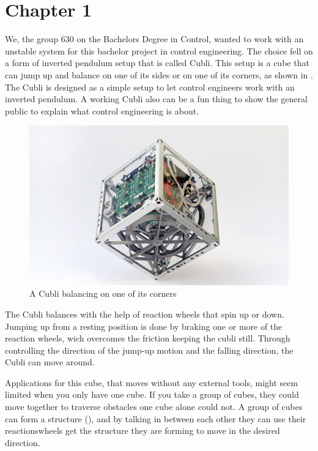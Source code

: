 \chapter{Chapter 1}
We, the group 630 on the Bachelors Degree in Control, wanted to work with an unstable system for this bachelor project in control engineering. The choice fell on a form of inverted pendulum setup that is called Cubli. This setup is a cube that can jump up and balance on one of its sides or on one of its corners, as shown in .
The Cubli is designed as a simple setup to let control engineers work with an inverted pendulum. A working Cubli also can be a fun thing to show the general public to explain what control engineering is about.  \cite{MGajamohan}

\begin{figure}[H] 
	\centering 
	\includegraphics[scale=1.3]{figures/CubliCorner-700x430}
	\caption{A Cubli balancing on one of its corners\cite{RAndrea}}
	\label{CubliCorner}
\end{figure} 
The Cubli balances with the help of reaction wheels that spin up or down. Jumping up from a resting position is done by braking one or more of the reaction wheels, wich overcomes the friction keeping the cubli still. 
Through controlling the direction of the jump-up motion and the falling direction, the Cubli can move around.

Applications for this cube, that moves without any external tools, might seem limited when you only have one cube. If you take a group of cubes, they could move together to traverse obstacles one cube alone could not. \cite{JRomanishin}
A group of cubes can form a structure (), and by talking in between each other they can use their reactionswheels get the structure they are forming to move in the desired direction.

